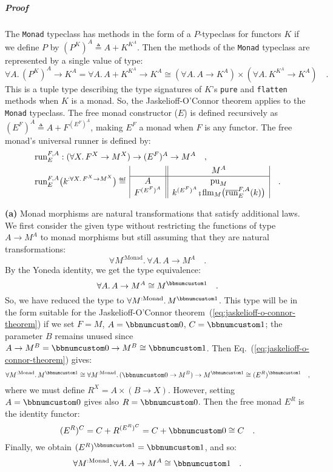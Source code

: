 \subparagraph{Proof}

The \lstinline!Monad! typeclass has methods in the form of a $P$-typeclass
for functors $K$ if we define $P$ by $(P^{K})^{A}\triangleq A+K^{K^{A}}$.
Then the methods of the \lstinline!Monad! typeclass are represented
by a single value of type: 
\[
\forall A.\,(P^{K})^{A}\rightarrow K^{A}=\forall A.\,A+K^{K^{A}}\rightarrow K^{A}\cong(\forall A.\,A\rightarrow K^{A})\times(\forall A.\,K^{K^{A}}\rightarrow K^{A})\quad.
\]
This is a tuple type describing the type signatures of $K$\textsf{'}s \lstinline!pure!
and \lstinline!flatten! methods when $K$ is a monad. So, the Jaskelioff-O\textsf{'}Connor
theorem applies to the \lstinline!Monad! typeclass. The free monad
constructor ($E$) is defined recursively as $(E^{F})^{A}\triangleq A+F^{(E^{F})^{A}}$,
making $E^{F}$ a monad when $F$ is any functor. The free monad\textsf{'}s
universal runner is defined by:
\begin{align*}
 & \text{run}_{E}^{F,A}:(\forall X.\,F^{X}\rightarrow M^{X})\rightarrow(E^{F})^{A}\rightarrow M^{A}\quad,\\
 & \text{run}_{E}^{F,A}\big(k^{:\forall X.\,F^{X}\rightarrow M^{X}}\big)\triangleq\,\begin{array}{|c||c|}
 & M^{A}\\
\hline A & \text{pu}_{M}\\
F^{(E^{F})^{A}} & k^{(E^{F})^{A}}\bef\text{flm}_{M}\big(\overline{\text{run}}_{E}^{F,A}(k)\big)
\end{array}\quad.
\end{align*}

\textbf{(a)} Monad morphisms are natural transformations that satisfy
additional laws. We first consider the given type without restricting
the functions of type $A\rightarrow M^{A}$ to monad morphisms but
still assuming that they are natural transformations:
\[
\forall M^{:\text{Monad}}.\,\forall A.\,A\rightarrow M^{A}\quad.
\]
By the Yoneda identity, we get the type equivalence: 
\[
\forall A.\,A\rightarrow M^{A}\cong M^{\bbnum 1}\quad.
\]
So, we have reduced the type to $\forall M^{:\text{Monad}}.\,M^{\bbnum 1}$.
This type will be in the form suitable for the Jaskelioff-O\textsf{'}Connor
theorem~(\ref{eq:jaskelioff-o-connor-theorem}) if we set $F=M$,
$A=\bbnum 0$, $C=\bbnum 1$; the parameter $B$ remains unused since
$A\rightarrow M^{B}=\bbnum 0\rightarrow M^{B}\cong\bbnum 1$. Then
Eq.~(\ref{eq:jaskelioff-o-connor-theorem}) gives:
\[
\forall M^{:\text{Monad}}.\,M^{\bbnum 1}\cong\forall M^{:\text{Monad}}.\,(\bbnum 0\rightarrow M^{B})\rightarrow M^{\bbnum 1}\cong(E^{R})^{\bbnum 1}\quad,
\]
where we must define $R^{X}=A\times(B\rightarrow X)$. However, setting
$A=\bbnum 0$ gives also $R=\bbnum 0$. Then the free monad $E^{R}$
is the identity functor: 
\[
(E^{R})^{C}=C+R^{(E^{R})^{C}}=C+\bbnum 0\cong C\quad.
\]
Finally, we obtain $(E^{R})^{\bbnum 1}=\bbnum 1$, and so:
\[
\forall M^{:\text{Monad}}.\,\forall A.\,A\rightarrow M^{A}\cong\bbnum 1\quad.
\]

